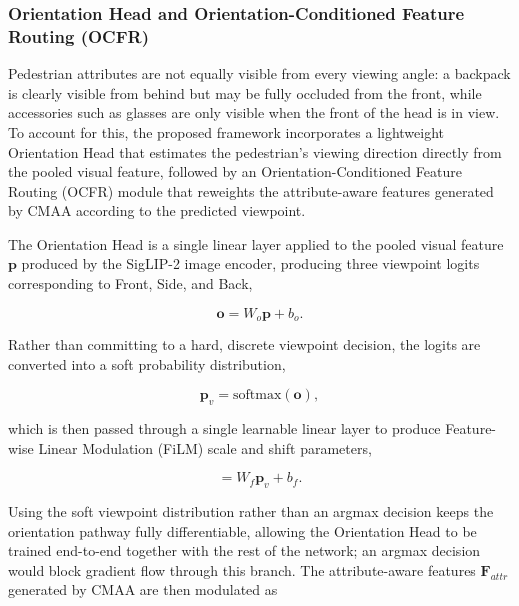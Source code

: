 \documentclass{ieeeaccess}
\begin{document}
\subsubsection{Orientation Head and Orientation-Conditioned Feature Routing (OCFR)}

Pedestrian attributes are not equally visible from every viewing angle: a backpack is clearly visible from behind but may be fully occluded from the front, while accessories such as glasses are only visible when the front of the head is in view. To account for this, the proposed framework incorporates a lightweight Orientation Head that estimates the pedestrian's viewing direction directly from the pooled visual feature, followed by an Orientation-Conditioned Feature Routing (OCFR) module that reweights the attribute-aware features generated by CMAA according to the predicted viewpoint.

The Orientation Head is a single linear layer applied to the pooled visual feature $\mathbf{p}$ produced by the SigLIP-2 image encoder, producing three viewpoint logits corresponding to Front, Side, and Back,

\begin{equation}
\mathbf{o}=W_{o}\mathbf{p}+b_{o}.
\label{eq:orient_logits}
\end{equation}

Rather than committing to a hard, discrete viewpoint decision, the logits are converted into a soft probability distribution,

\begin{equation}
\mathbf{p}_{v}=\mathrm{softmax}(\mathbf{o}),
\label{eq:orient_softmax}
\end{equation}

which is then passed through a single learnable linear layer to produce Feature-wise Linear Modulation (FiLM) scale and shift parameters,

\begin{equation}
[\boldsymbol{\gamma},\boldsymbol{\beta}]=W_{f}\mathbf{p}_{v}+b_{f}.
\label{eq:film_params}
\end{equation}

Using the soft viewpoint distribution rather than an argmax decision keeps the orientation pathway fully differentiable, allowing the Orientation Head to be trained end-to-end together with the rest of the network; an argmax decision would block gradient flow through this branch. The attribute-aware features $\mathbf{F}_{attr}$ generated by CMAA are then modulated as
\end{document}
